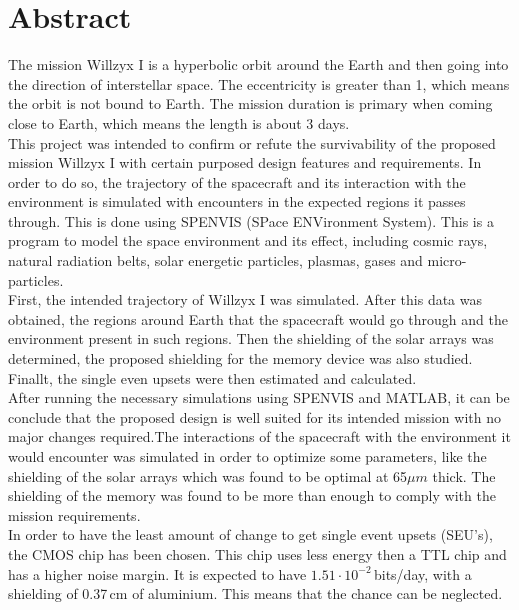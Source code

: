 {}
\section*{\label{sec:abstract}Abstract}
The mission Willzyx I is a hyperbolic orbit around the Earth and then going into the direction of interstellar space. The eccentricity is greater than 1, which means the orbit is not bound to Earth. The mission duration is primary when coming close to Earth, which means the length is about 3 days.\\

This project was intended to confirm or refute the survivability of the proposed mission Willzyx I with certain purposed design features and requirements. In order to do so, the trajectory of the spacecraft and its interaction with the environment is simulated with encounters in the expected regions it passes through. This is done using SPENVIS (SPace ENVironment System). This is a program to model the space environment and its effect, including cosmic rays, natural radiation belts, solar energetic particles, plasmas, gases and micro-particles.\\

First, the intended trajectory of Willzyx I was simulated. After this data was obtained, the regions around Earth that the spacecraft would go through and the environment present in such regions. Then the shielding of the solar arrays was determined, the proposed shielding for the memory device was also studied. Finallt, the single even upsets were then estimated and calculated.\\

After running the necessary simulations using SPENVIS and MATLAB, it can be conclude that the proposed design is well suited for its intended mission with no major changes required.The interactions of the spacecraft with the environment it would encounter was simulated in order to optimize some parameters, like the shielding of the solar arrays which was found to be optimal at 65$\mu m$ thick. The shielding of the memory was found to be more than enough to comply with the mission requirements. \\

In order to have the least amount of change to get single event upsets (SEU's), the CMOS chip has been chosen. This chip uses less energy then a TTL chip and has a higher noise margin. It is expected to have $1.51 \cdot 10^{-2}$\,bits/day, with a shielding of 0.37\,cm of aluminium. This means that the chance can be neglected.
